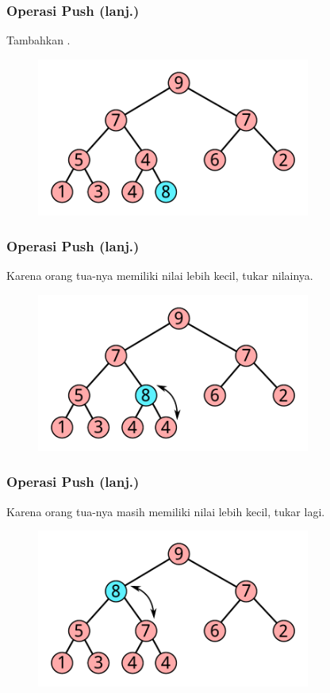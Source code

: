 \begin{frame}
\frametitle{Operasi Push (lanj.)}
Tambahkan \fnode.
\begin{figure}
  \includegraphics[width=9cm]{asset/push-1.pdf}
\end{figure}
\end{frame}

\begin{frame}
\frametitle{Operasi Push (lanj.)}
Karena orang tua-nya memiliki nilai lebih kecil, tukar nilainya.
\begin{figure}
  \includegraphics[width=9cm]{asset/push-2.pdf}
\end{figure}
\end{frame}

\begin{frame}
\frametitle{Operasi Push (lanj.)}
Karena orang tua-nya masih memiliki nilai lebih kecil, tukar lagi.
\begin{figure}
  \includegraphics[width=9cm]{asset/push-3.pdf}
\end{figure}
\end{frame}

